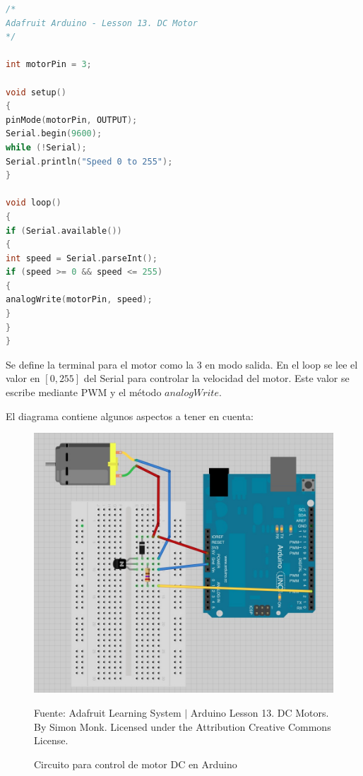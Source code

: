 \documentclass[conference]{IEEEtran}
\begin{document}
\begin{lstlisting}[language=C, caption=Control de motor DC con PWM. Fuente: Adafruit Learning System $\mid$ Arduino Lesson 13. DC Motors. Under fair use. \cite{monk-dc-motors-2012}]
/*
Adafruit Arduino - Lesson 13. DC Motor
*/

int motorPin = 3;

void setup()
{
pinMode(motorPin, OUTPUT);
Serial.begin(9600);
while (!Serial);
Serial.println("Speed 0 to 255");
}

void loop()
{
if (Serial.available())
{
int speed = Serial.parseInt();
if (speed >= 0 && speed <= 255)
{
analogWrite(motorPin, speed);
}
}
}
\end{lstlisting}

Se define la terminal para el motor como la $3$ en modo salida. En el loop se lee el valor en $[0, 255]$ del Serial para controlar la velocidad del motor. Este valor se escribe mediante PWM y el método $analogWrite$.

\bigbreak

El diagrama contiene algunos aspectos a tener en cuenta:

\begin{figure}[H]
\centering
\includegraphics[width=0.3\paperwidth]{images/dc-motor-arduino-circuit.jpg}
\caption{Circuito para control de motor DC en Arduino}
\footnotesize
Fuente: Adafruit Learning System $\mid$ Arduino Lesson 13. DC Motors. By Simon Monk. Licensed under the Attribution Creative Commons License.
\end{figure}
\end{document}
